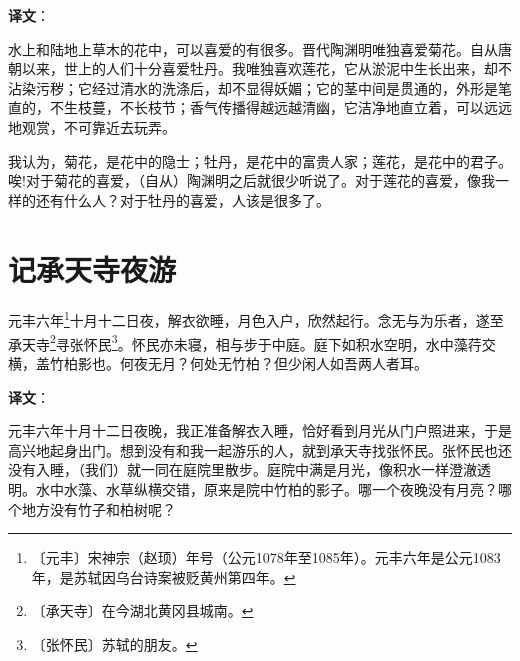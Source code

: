 \documentclass[12pt,UTF-8,openany]{ctexbook}
\begin{document}
\newpage

\textbf{译文}：

\vspace{1em}

\begin{normalsize}
    
    水上和陆地上草木的花中，可以喜爱的有很多。晋代陶渊明唯独喜爱菊花。自从唐朝以来，世上的人们十分喜爱牡丹。我唯独喜欢莲花，它从淤泥中生长出来，却不沾染污秽；它经过清水的洗涤后，却不显得妖媚；它的茎中间是贯通的，外形是笔直的，不生枝蔓，不长枝节；香气传播得越远越清幽，它洁净地直立着，可以远远地观赏，不可靠近去玩弄。
    
    我认为，菊花，是花中的隐士；牡丹，是花中的富贵人家；莲花，是花中的君子。唉!对于菊花的喜爱，（自从）陶渊明之后就很少听说了。对于莲花的喜爱，像我一样的还有什么人？对于牡丹的喜爱，人该是很多了。
    
\end{normalsize}



\chapter{记承天寺夜游}

\begin{normalsize}
    
    元丰六年\footnote{〔元丰〕宋神宗（赵顼）年号（公元1078年至1085年）。元丰六年是公元1083年，是苏轼因乌台诗案被贬黄州第四年。}十月十二日夜，解衣欲睡，月色入户，欣然起行。念无与为乐者，遂至承天寺\footnote{〔承天寺〕在今湖北黄冈县城南。}寻张怀民\footnote{〔张怀民〕苏轼的朋友。}。怀民亦未寝，相与步于中庭。庭下如积水空明，水中藻荇交横，盖竹柏影也。何夜无月？何处无竹柏？但少闲人如吾两人者耳。
\end{normalsize}


\newpage

\textbf{译文}：

\vspace{1em}

\begin{normalsize}
    
    元丰六年十月十二日夜晚，我正准备解衣入睡，恰好看到月光从门户照进来，于是高兴地起身出门。想到没有和我一起游乐的人，就到承天寺找张怀民。张怀民也还没有入睡，（我们）就一同在庭院里散步。庭院中满是月光，像积水一样澄澈透明。水中水藻、水草纵横交错，原来是院中竹柏的影子。哪一个夜晚没有月亮？哪个地方没有竹子和柏树呢？
    
\end{normalsize}
\end{document}
